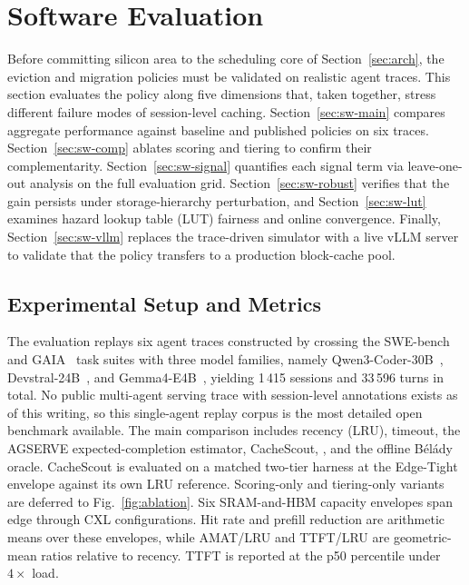 \section{Software Evaluation}
\label{sec:sweval}

Before committing silicon area to the scheduling core of
Section~\ref{sec:arch}, the eviction and migration policies must be
validated on realistic agent traces. This section evaluates the
\unison policy along five dimensions that, taken together, stress
different failure modes of session-level caching.
Section~\ref{sec:sw-main} compares aggregate performance against
baseline and published policies on six traces.
Section~\ref{sec:sw-comp} ablates scoring and tiering to confirm their
complementarity. Section~\ref{sec:sw-signal} quantifies each signal
term via leave-one-out analysis on the full evaluation grid.
Section~\ref{sec:sw-robust} verifies that the gain persists under
storage-hierarchy perturbation, and Section~\ref{sec:sw-lut} examines
hazard lookup table (LUT) fairness and online convergence. Finally,
Section~\ref{sec:sw-vllm} replaces the trace-driven simulator with a
live vLLM server to validate that the policy transfers to a production
block-cache pool.

\subsection{Experimental Setup and Metrics}
\label{sec:sw-setup}

The evaluation replays six agent traces constructed by crossing the
SWE-bench~\cite{jimenez_swebench_2024} and
GAIA~\cite{mialon_gaia_2023} task suites with three model families,
namely Qwen3-Coder-30B~\cite{qwen3_2025},
Devstral-24B~\cite{devstral_2025}, and
Gemma4-E4B~\cite{gemma4_2026}, yielding 1\,415 sessions and 33\,596
turns in total. No public multi-agent serving trace with session-level
annotations exists as of this writing, so this single-agent replay
corpus is the most detailed open benchmark available. The main comparison includes recency (LRU), timeout,
the AGSERVE expected-completion estimator, CacheScout, \unison, and the
offline B\'el\'ady oracle. CacheScout is evaluated on a matched
two-tier harness at the Edge-Tight envelope against its own LRU
reference. Scoring-only and tiering-only variants are deferred to
Fig.~\ref{fig:ablation}. Six SRAM-and-HBM capacity envelopes span edge
through CXL configurations. Hit rate and prefill reduction are
arithmetic means over these envelopes, while AMAT/LRU and TTFT/LRU are
geometric-mean ratios relative to recency. TTFT is reported at the p50
percentile under $4\times$ load.

